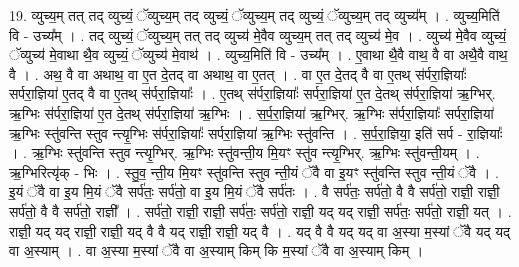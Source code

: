 \documentclass[17pt]{extarticle}
\begin{document}
19. व्युच्य॒म् तत् तद् व्युच्यं॒ ॅव्युच्य॒म् तद् व्युच्यं॒ ॅव्युच्य॒म् तद् व्युच्यं॒ ॅव्युच्य॒म् तद् व्युच्य᳚म् । . व्युच्य॒मिति॑ वि - उच्य᳚म् । . तद् व्युच्यं॒ ॅव्युच्य॒म् तत् तद् व्युच्य॑ मे॒वैव व्युच्य॒म् तत् तद् व्युच्य॑ मे॒व । . व्युच्य॑ मे॒वैव व्युच्यं॒ ॅव्युच्य॑ मे॒वाथा थै॒व व्युच्यं॒ ॅव्युच्य॑ मे॒वाथ॑ । . व्युच्य॒मिति॑ वि - उच्य᳚म् । . ए॒वाथा थै॒वै वाथ॒ वै वा अथै॒वै वाथ॒ वै । . अथ॒ वै वा अथाथ॒ वा ए॒त दे॒तद् वा अथाथ॒ वा ए॒तत् । . वा ए॒त दे॒तद् वै वा ए॒तथ् स॑र्परा॒ज्ञियाः᳚ सर्परा॒ज्ञिया॑ ए॒तद् वै वा ए॒तथ् स॑र्परा॒ज्ञियाः᳚ । . ए॒तथ् स॑र्परा॒ज्ञियाः᳚ सर्परा॒ज्ञिया॑ ए॒त दे॒तथ् स॑र्परा॒ज्ञिया॑ ऋ॒ग्भिर्. ऋ॒ग्भिः स॑र्परा॒ज्ञिया॑ ए॒त दे॒तथ् स॑र्परा॒ज्ञिया॑ ऋ॒ग्भिः । . स॒र्प॒रा॒ज्ञिया॑ ऋ॒ग्भिर्. ऋ॒ग्भिः स॑र्परा॒ज्ञियाः᳚ सर्परा॒ज्ञिया॑ ऋ॒ग्भिः स्तु॑वन्ति स्तुव न्त्यृ॒ग्भिः स॑र्परा॒ज्ञियाः᳚ सर्परा॒ज्ञिया॑ ऋ॒ग्भिः स्तु॑वन्ति । . स॒र्प॒रा॒ज्ञिया॒ इति॑ सर्प - रा॒ज्ञियाः᳚ । . ऋ॒ग्भिः स्तु॑वन्ति स्तुव न्त्यृ॒ग्भिर्. ऋ॒ग्भिः स्तु॑वन्ती॒य मि॒यꣳ स्तु॑व न्त्यृ॒ग्भिर्. ऋ॒ग्भिः स्तु॑वन्ती॒यम् । . ऋ॒ग्भिरित्यृ॑क् - भिः । . स्तु॒व॒ न्ती॒य मि॒यꣳ स्तु॑वन्ति स्तुव न्ती॒यं ॅवै वा इ॒यꣳ स्तु॑वन्ति स्तुव न्ती॒यं ॅवै । . इ॒यं ॅवै वा इ॒य मि॒यं ॅवै सर्प॑तः॒ सर्प॑तो॒ वा इ॒य मि॒यं ॅवै सर्प॑तः । . वै सर्प॑तः॒ सर्प॑तो॒ वै वै सर्प॑तो॒ राज्ञी॒ राज्ञी॒ सर्प॑तो॒ वै वै सर्प॑तो॒ राज्ञी᳚ । . सर्प॑तो॒ राज्ञी॒ राज्ञी॒ सर्प॑तः॒ सर्प॑तो॒ राज्ञी॒ यद् यद् राज्ञी॒ सर्प॑तः॒ सर्प॑तो॒ राज्ञी॒ यत् । . राज्ञी॒ यद् यद् राज्ञी॒ राज्ञी॒ यद् वै वै यद् राज्ञी॒ राज्ञी॒ यद् वै । . यद् वै वै यद् यद् वा अ॒स्या म॒स्यां ॅवै यद् यद् वा अ॒स्याम् । . वा अ॒स्या म॒स्यां ॅवै वा अ॒स्याम् किम् कि म॒स्यां ॅवै वा अ॒स्याम् किम् । \newline
\end{document}
